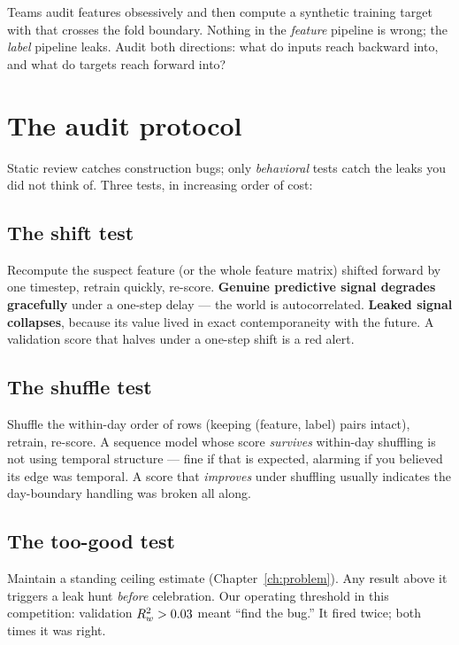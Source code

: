 \begin{warnbox}
Teams audit features obsessively and then compute a synthetic training
target with  that crosses the fold boundary. Nothing in
the \emph{feature} pipeline is wrong; the \emph{label} pipeline leaks.
Audit both directions: what do inputs reach backward into, and what do
targets reach forward into?
\end{warnbox}

\section{The audit protocol}

Static review catches construction bugs; only \emph{behavioral} tests catch
the leaks you did not think of. Three tests, in increasing order of cost:

\subsection{The shift test}

Recompute the suspect feature (or the whole feature matrix) shifted forward
by one timestep, retrain quickly, re-score. \textbf{Genuine predictive
signal degrades gracefully} under a one-step delay --- the world is
autocorrelated. \textbf{Leaked signal collapses}, because its value lived
in exact contemporaneity with the future. A validation score that halves
under a one-step shift is a red alert.

\subsection{The shuffle test}

Shuffle the within-day order of rows (keeping (feature, label) pairs
intact), retrain, re-score. A sequence model whose score \emph{survives}
within-day shuffling is not using temporal structure --- fine if that is
expected, alarming if you believed its edge was temporal. A score that
\emph{improves} under shuffling usually indicates the day-boundary handling
was broken all along.

\subsection{The too-good test}

Maintain a standing ceiling estimate (Chapter~\ref{ch:problem}). Any result
above it triggers a leak hunt \emph{before} celebration. Our operating
threshold in this competition: validation $R^2_{w} > 0.03$ meant ``find the
bug.'' It fired twice; both times it was right.

